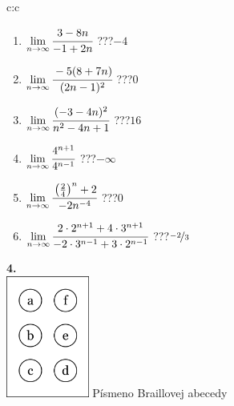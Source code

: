 \documentclass[10pt]{report}
\begin{document}
\begin{tabular}{c:c}
\begin{minipage}[c][104.5mm][t]{0.5\linewidth}
\begin{center}
\begin{minipage}{0.79\linewidth}
\begin{center}
\begin{varwidth}{\linewidth}
\begin{enumerate}
\normalsize
\item $\lim\limits_{n\to\infty}\cfrac{3-8n}{-1+2n}$\quad \dotfill\; ???\;\dotfill \quad $-4$
\item $\lim\limits_{n\to\infty}\cfrac{-5(8+7n)}{(2n-1)^2}$\quad \dotfill\; ???\;\dotfill \quad $0$
\item $\lim\limits_{n\to\infty}\cfrac{(-3-4n)^2}{n^2-4n+1}$\quad \dotfill\; ???\;\dotfill \quad $16$
\item $\lim\limits_{n\to\infty}\cfrac{4^{n+1}}{4^{n-1}}$\quad \dotfill\; ???\;\dotfill \quad $-\infty$
\item $\lim\limits_{n\to\infty}\cfrac{\left(\frac{2}{4}\right)^n +2}{-2n^{-4}}$\quad \dotfill\; ???\;\dotfill \quad $0$
\item $\lim\limits_{n\to\infty}\cfrac{2\cdot 2^{n+1}+4\cdot 3^{n+1}}{-2\cdot 3^{n-1}+3\cdot 2^{n-1}}$\quad \dotfill\; ???\;\dotfill \quad $\nicefrac{-2}{3}$
\end{enumerate}
\end{varwidth}
\end{center}
\end{minipage}
\begin{minipage}{0.20\linewidth}
\begin{center}
{\Huge\bfseries 4.} \\[2mm]
\includegraphics[height=40mm]{../images/braille.png}
{\small Písmeno Braillovej abecedy}
\end{center}
\end{minipage}
\end{center}
\end{minipage}
%
\end{tabular}
\newpage
\thispagestyle{empty}
\end{document}
